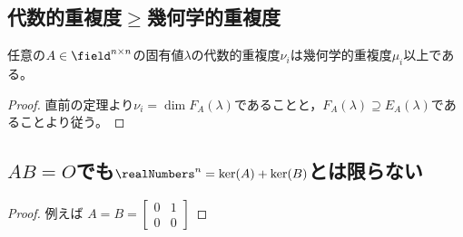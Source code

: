         \subsection{代数的重複度\texorpdfstring{$\geq$}{≥}幾何学的重複度}
            \begin{shadebox}
                任意の$A\in\field^{n\times n}$の固有値$\lambda$の代数的重複度$\nu_i$は幾何学的重複度$\mu_i$以上である。
            \end{shadebox}
            \begin{proof}
                直前の定理より$\nu_i = \dim{F_A(\lambda)}$であることと，$F_A(\lambda) \supseteq E_A(\lambda)$であることより従う。
            \end{proof}
        \subsection{\texorpdfstring{$AB=O$}{AB=O}でも\texorpdfstring{$\realNumbers^n = \ker(A) + \ker(B)$}{R\string^n = ker(A) + ker(B)}とは限らない}
            \begin{proof}
                例えば
                $
                    A=B=
                    \begin{bmatrix}
                        0 & 1 \\
                        0 & 0
                    \end{bmatrix}
                $
            \end{proof}

